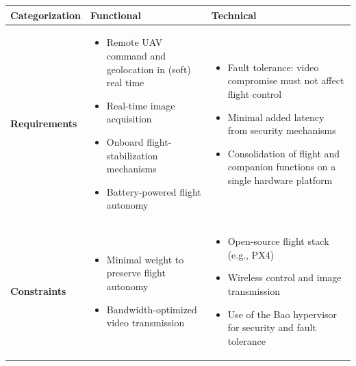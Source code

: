 \begin{table}[t]
  \begin{tabularx}{\textwidth}{
    >{\raggedright\arraybackslash}p{}  %
    >{\raggedright\arraybackslash}X                   %
    >{\raggedright\arraybackslash}X                   %
  }
    \toprule
    \textbf{Categorization} & \textbf{Functional} & \textbf{Technical} \\
    \midrule
    \textbf{Requirements} &
    \begin{itemize}[leftmargin=*,nosep,topsep=0pt]
      \item Remote UAV command and geolocation in (soft) real time
      \item Real-time image acquisition
      \item Onboard flight-stabilization mechanisms
      \item Battery-powered flight autonomy
    \end{itemize}
    &
    \begin{itemize}[leftmargin=*,nosep,topsep=0pt]
      \item Fault tolerance: video compromise must not affect flight control
      \item Minimal added latency from security mechanisms
      \item Consolidation of flight and companion functions on a single hardware platform
    \end{itemize}
    \\
    \addlinespace[0.3em]
    \textbf{Constraints} &
    \begin{itemize}[leftmargin=*,nosep,topsep=0pt]
      \item Minimal weight to preserve flight autonomy
      \item Bandwidth-optimized video transmission
    \end{itemize}
    &
    \begin{itemize}[leftmargin=*,nosep,topsep=0pt]
      \item Open-source flight stack (e.g., PX4)
      \item Wireless control and image transmission
      \item Use of the Bao hypervisor for security and fault tolerance
    \end{itemize}
    \\
    \bottomrule
  \end{tabularx}
  \endgroup
\end{table}


